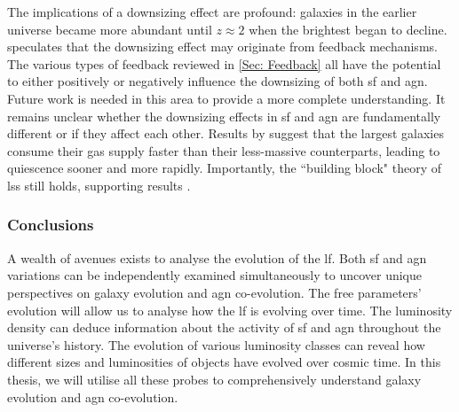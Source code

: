The implications of a downsizing effect are profound: galaxies in the earlier universe became more abundant until $z\approx2$ when the brightest began to decline. \cite{fiore_agn_2017} speculates that the downsizing effect may originate from feedback mechanisms. The various types of feedback reviewed in \cref{Sec: Feedback} all have the potential to either positively or negatively influence the downsizing of both \gls{sf} and \gls{agn}. Future work is needed in this area to provide a more complete understanding. It remains unclear whether the downsizing effects in \gls{sf} and \gls{agn} are fundamentally different or if they affect each other. Results by \cite{fanidakis_evolution_2012} suggest that the largest galaxies consume their gas supply faster than their less-massive counterparts, leading to quiescence sooner and more rapidly. Importantly, the ``building block" theory of \gls{lss} still holds, supporting \cite{fanidakis_evolution_2012} results \citep{magorrian_demography_1998}.

\subsubsection{Conclusions}
A wealth of avenues exists to analyse the evolution of the \gls{lf}. Both \gls{sf} and \gls{agn} variations can be independently examined simultaneously to uncover unique perspectives on galaxy evolution and \gls{agn} co-evolution. The free parameters' evolution will allow us to analyse how the \gls{lf} is evolving over time. The luminosity density can deduce information about the activity of \gls{sf} and \gls{agn} throughout the universe's history. The evolution of various luminosity classes can reveal how different sizes and luminosities of objects have evolved over cosmic time. In this thesis, we will utilise all these probes to comprehensively understand galaxy evolution and \gls{agn} co-evolution. 



